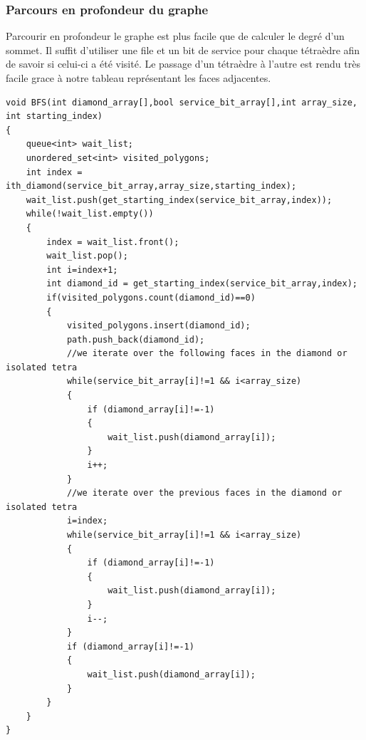 \documentclass[a4paper,11pt,openany]{article}
\begin{document}
\subsubsection{Parcours en profondeur du graphe}
\noindent
Parcourir en profondeur le graphe est plus facile que de calculer le degré d'un sommet. Il suffit d'utiliser une file et un bit de service pour chaque tétraèdre afin de savoir si celui-ci a été visité. Le passage d'un tétraèdre à l'autre est rendu très facile grace à notre tableau représentant les faces adjacentes.
\begin{lstlisting}
void BFS(int diamond_array[],bool service_bit_array[],int array_size,
int starting_index)
{
    queue<int> wait_list;
    unordered_set<int> visited_polygons; 
    int index = ith_diamond(service_bit_array,array_size,starting_index);    
    wait_list.push(get_starting_index(service_bit_array,index)); 
    while(!wait_list.empty())
    {
        index = wait_list.front();
        wait_list.pop();
        int i=index+1;
        int diamond_id = get_starting_index(service_bit_array,index);
        if(visited_polygons.count(diamond_id)==0)
        {
            visited_polygons.insert(diamond_id);
            path.push_back(diamond_id);
            //we iterate over the following faces in the diamond or isolated tetra
            while(service_bit_array[i]!=1 && i<array_size)
            {
                if (diamond_array[i]!=-1)
                {
                    wait_list.push(diamond_array[i]);
                }
                i++;               
            }
            //we iterate over the previous faces in the diamond or isolated tetra
            i=index;
            while(service_bit_array[i]!=1 && i<array_size)
            {
                if (diamond_array[i]!=-1)
                {
                    wait_list.push(diamond_array[i]);
                }
                i--;
            }
            if (diamond_array[i]!=-1)
            {
                wait_list.push(diamond_array[i]);
            }
        }
    }
}
\end{lstlisting}
\end{document}
